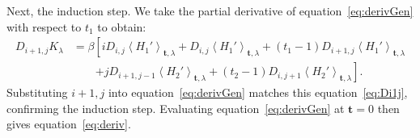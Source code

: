 \documentclass{article}
\let\vec\mathbf
\begin{document}
\begin{appendices}
Next, the induction step. We take the partial derivative of  equation~\ref{eq:derivGen} with respect to $t_1$ to obtain:
\begin{align}
D_{i+1,j}K_\lambda &= \beta \left[ 
	i  D_{i,j} \left \langle H_1' \right \rangle_{\vec t, \lambda}  + D_{i,j} \left \langle H_1' \right \rangle_{\vec t, \lambda}  + \left(t_1-1\right) D_{i+1,j} \left \langle H_1' \right \rangle_{\vec t, \lambda} 
\right. \nonumber \\ & \qquad \left. 
	+ j D_{i+1,j-1} \left \langle H_2' \right \rangle_{\vec t, \lambda}   + \left(t_2-1\right) D_{i,j+1} \left \langle H_2' \right \rangle_{\vec t, \lambda} 
	\right]. 
\label{eq:Di1j}
\end{align}
Substituting $i+1,j$ into equation~\ref{eq:derivGen} matches this equation~\ref{eq:Di1j}, confirming the induction step. Evaluating equation~\ref{eq:derivGen} at $\vec{t}=0$ then gives equation~\ref{eq:deriv}. 



\end{appendices}



\end{document}
